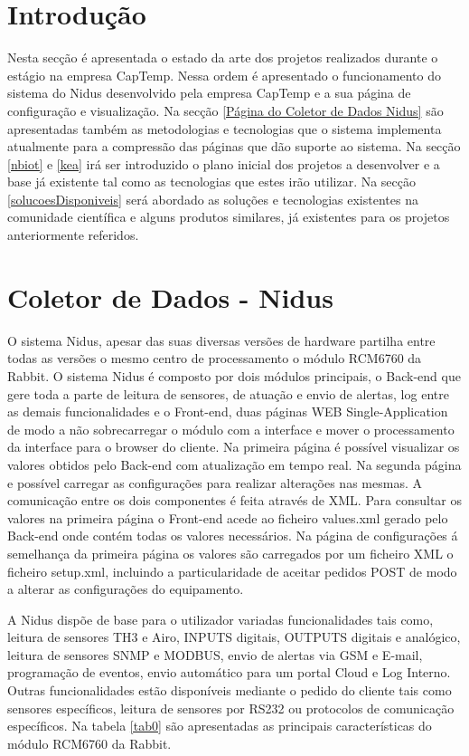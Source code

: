 
\section{Introdução}
Nesta secção é apresentada o estado da arte dos projetos realizados durante o estágio na empresa CapTemp. Nessa ordem é apresentado o funcionamento do sistema do Nidus desenvolvido pela empresa CapTemp e a sua página de configuração e visualização. Na secção \ref{Página do Coletor de Dados Nidus} são apresentadas também as metodologias e tecnologias que o sistema implementa atualmente para a compressão das páginas que dão suporte ao sistema. Na secção \ref{nbiot} e \ref{kea} irá ser introduzido o plano inicial dos projetos a desenvolver e a base já existente tal como as tecnologias que estes irão utilizar. Na secção \ref{solucoesDisponiveis} será abordado as soluções e tecnologias existentes na comunidade científica e alguns produtos similares, já existentes para os projetos anteriormente referidos.

\section{Coletor de Dados - Nidus} \label{Coletor de Dados - Nidus}
\par
O sistema Nidus, apesar das suas diversas versões de hardware partilha entre todas as versões o mesmo centro de processamento o módulo RCM6760 da Rabbit. O sistema Nidus é composto por dois módulos principais, o Back-end que gere toda a parte de leitura de sensores, de atuação e envio de alertas, log entre as demais funcionalidades e o Front-end, duas páginas WEB Single-Application de modo a não sobrecarregar o módulo com a interface e mover o processamento da interface para o browser do cliente. Na primeira página é possível visualizar os valores obtidos pelo Back-end com atualização em tempo real. Na segunda página e possível carregar as configurações para realizar alterações nas mesmas. A comunicação entre os dois componentes é feita através de XML. Para consultar os valores na primeira página o Front-end acede ao ficheiro values.xml gerado pelo Back-end onde contém todas os valores necessários. Na página de configurações á semelhança da primeira página os valores são carregados por um ficheiro XML o ficheiro setup.xml, incluindo a particularidade de aceitar pedidos POST de modo a alterar as configurações do equipamento.
\par A Nidus dispõe de base para o utilizador variadas funcionalidades tais como, leitura de sensores TH3 e Airo, INPUTS digitais, OUTPUTS digitais e analógico, leitura de sensores SNMP e MODBUS, envio de alertas via GSM e E-mail, programação de eventos, envio automático para um portal Cloud e Log Interno. Outras funcionalidades estão disponíveis mediante o pedido do cliente tais como sensores específicos, leitura de sensores por RS232 ou protocolos de comunicação específicos.
Na tabela \ref{tab0} são apresentadas as principais características do módulo RCM6760 da Rabbit.




